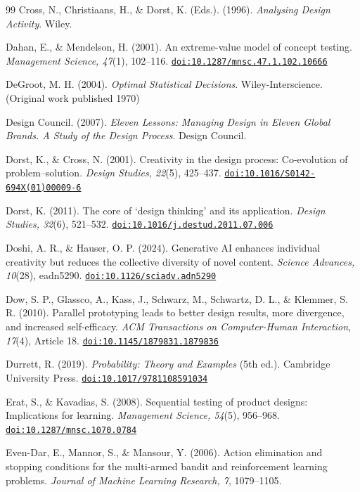 \documentclass[10pt,twocolumn]{article}
\providecommand{\doi}[1]{\href{https://doi.org/#1}{\nolinkurl{doi:#1}}}
\theoremstyle{definition}
\begin{document}
\begin{thebibliography}{99}
 Cross, N., Christiaans, H., \& Dorst, K. (Eds.). (1996). \textit{Analysing Design Activity}. Wiley.

 Dahan, E., \& Mendelson, H. (2001). An extreme-value model of concept testing. \textit{Management Science, 47}(1), 102--116. \doi{10.1287/mnsc.47.1.102.10666}

 DeGroot, M. H. (2004). \textit{Optimal Statistical Decisions}. Wiley-Interscience. (Original work published 1970)

 Design Council. (2007). \textit{Eleven Lessons: Managing Design in Eleven Global Brands. A Study of the Design Process}. Design Council.

 Dorst, K., \& Cross, N. (2001). Creativity in the design process: Co-evolution of problem--solution. \textit{Design Studies, 22}(5), 425--437. \doi{10.1016/S0142-694X(01)00009-6}

 Dorst, K. (2011). The core of `design thinking' and its application. \textit{Design Studies, 32}(6), 521--532. \doi{10.1016/j.destud.2011.07.006}

 Doshi, A. R., \& Hauser, O. P. (2024). Generative AI enhances individual creativity but reduces the collective diversity of novel content. \textit{Science Advances, 10}(28), eadn5290. \doi{10.1126/sciadv.adn5290}

 Dow, S. P., Glassco, A., Kass, J., Schwarz, M., Schwartz, D. L., \& Klemmer, S. R. (2010). Parallel prototyping leads to better design results, more divergence, and increased self-efficacy. \textit{ACM Transactions on Computer-Human Interaction, 17}(4), Article 18. \doi{10.1145/1879831.1879836}

 Durrett, R. (2019). \textit{Probability: Theory and Examples} (5th ed.). Cambridge University Press. \doi{10.1017/9781108591034}

 Erat, S., \& Kavadias, S. (2008). Sequential testing of product designs: Implications for learning. \textit{Management Science, 54}(5), 956--968. \doi{10.1287/mnsc.1070.0784}

 Even-Dar, E., Mannor, S., \& Mansour, Y. (2006). Action elimination and stopping conditions for the multi-armed bandit and reinforcement learning problems. \textit{Journal of Machine Learning Research, 7}, 1079--1105.


\end{thebibliography}
\end{document}
